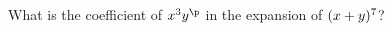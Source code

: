 
%
%
%
%      
% 
% 
%   



\SUBTRACT\vbone\vbtwo\p

\question[3] What is the coefficient of $x^{\vbtwo} y^{\p}$ in the expansion of $(x + y)^{7}$?

\insertQR{}

\watchout

